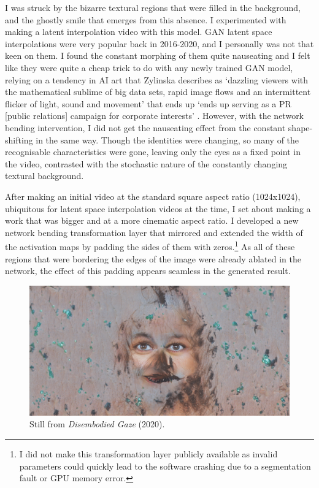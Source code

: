 I was struck by the bizarre textural regions that were filled in the background, and the ghostly smile that emerges from this absence. 
I experimented with making a latent interpolation video with this model. GAN latent space interpolations were very popular back in 2016-2020, and I personally was not that keen on them.
I found the constant morphing of them quite nauseating and I felt like they were quite a cheap trick to do with any newly trained GAN model, relying on a tendency in AI art that Zylinska describes as `dazzling viewers with the mathematical sublime of big data sets, rapid image flows and an intermittent flicker of light, sound and movement' that ends up `ends up serving as a PR [public relations] campaign for corporate interests'  \citeyearpar{zylinska2020ai}. 
However, with the network bending intervention, I did not get the nauseating effect from the constant shape-shifting in the same way. 
Though the identities were changing, so many of the recognisable characteristics were gone, leaving only the eyes as a fixed point in the video, contrasted with the stochastic nature of the constantly changing textural background. 

After making an initial video at the standard square aspect ratio (1024x1024), ubiquitous for latent space interpolation videos at the time, I set about making a work that was bigger and at a more cinematic aspect ratio. 
I developed a new network bending transformation layer that mirrored and extended the width of the activation maps by padding the sides of them with zeros.\footnote{
    I did not make this transformation layer publicly available as invalid parameters could quickly lead to the software crashing due to a segmentation fault or GPU memory error.
}
As all of these regions that were bordering the edges of the image were already ablated in the network, the effect of this padding appears seamless in the generated result. 

\begin{figure}[!htb]
    \centering
    \captionsetup{justification=centering}
    \includegraphics[width=1\textwidth]{figures/c7_impact/disembodied_gaze.png}
    \caption{Still from \textit{Disembodied Gaze} (2020).}
    \label{fig:c7:disembodied-gaze-wide}
\end{figure}

